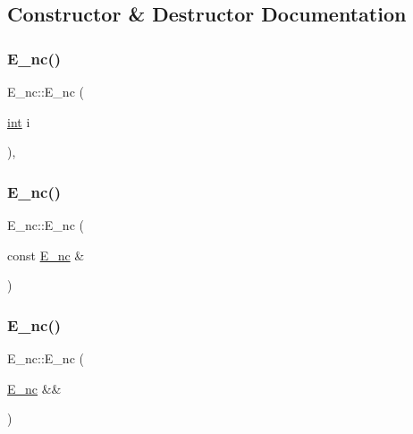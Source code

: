 \subsection{Constructor \& Destructor Documentation}
\mbox{\label{class_e__nc_adacd8dd96177d755c54db09108e381ff}} 
\subsubsection{\texorpdfstring{E\_nc()}{E\_nc()}\hspace{0.1cm}{\footnotesize\ttfamily [1/3]}}
{\footnotesize\ttfamily E\+\_\+nc\+::\+E\+\_\+nc (\begin{DoxyParamCaption}\item[{\mbox{\hyperlink{warnings_8h_a74f207b5aa4ba51c3a2ad59b219a423b}{int}}}]{i }\end{DoxyParamCaption})\hspace{0.3cm}{\ttfamily [inline]}, {\ttfamily [explicit]}}

\mbox{\label{class_e__nc_a42e51ed614a7af4fd2d0f6d71a077fab}} 
\subsubsection{\texorpdfstring{E\_nc()}{E\_nc()}\hspace{0.1cm}{\footnotesize\ttfamily [2/3]}}
{\footnotesize\ttfamily E\+\_\+nc\+::\+E\+\_\+nc (\begin{DoxyParamCaption}\item[{const \mbox{\hyperlink{class_e__nc}{E\+\_\+nc}} \&}]{ }\end{DoxyParamCaption})\hspace{0.3cm}{\ttfamily [delete]}}

\mbox{\label{class_e__nc_acec3382251095c3b96ad1bd4c9d12179}} 
\subsubsection{\texorpdfstring{E\_nc()}{E\_nc()}\hspace{0.1cm}{\footnotesize\ttfamily [3/3]}}
{\footnotesize\ttfamily E\+\_\+nc\+::\+E\+\_\+nc (\begin{DoxyParamCaption}\item[{\mbox{\hyperlink{class_e__nc}{E\+\_\+nc}} \&\&}]{ }\end{DoxyParamCaption})\hspace{0.3cm}{\ttfamily [default]}}



